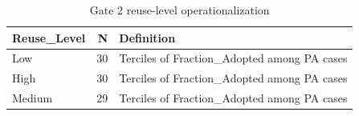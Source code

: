 \begin{table}
\caption{Gate 2 reuse-level operationalization}
\label{tab:gate2-reuse-levels}
\begin{tabular}{lrl}
\toprule
Reuse_Level & N & Definition \\
\midrule
Low & 30 & Terciles of Fraction_Adopted among PA cases \\
High & 30 & Terciles of Fraction_Adopted among PA cases \\
Medium & 29 & Terciles of Fraction_Adopted among PA cases \\
\bottomrule
\end{tabular}
\end{table}
